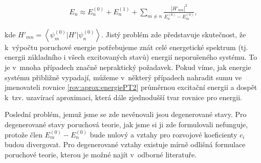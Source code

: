 \begin{eqnarray}
E_n\approx E_n^{(0)}+E_n^{(1)}+\sum_{m\neq n} \frac{\left | H'_{mn} \right |^2}{E_n^{(0)}-E_m^{(0)}},
\label{rov:aprox:energiePT2}
\end{eqnarray}

\noindent kde $H'_{mn}=\left < \psi_m^{(0)}|H'|\psi_n^{(0)}\right >$. Jistý problém zde představuje skutečnost, že k~výpočtu poruchové energie potřebujeme znát celé energetické spektrum (tj. energii základního i všech excitovaných stavů) energií neporušeného systému. To je v~mnoha případech značně nepraktický požadavek. Pokud víme, jak energie systému přibližně vypadají, můžeme v~některý případech nahradit sumu ve jmenovateli rovnice \ref{rov:aprox:energiePT2} průměrnou excitační energii a dospět k~tzv. uzavírací aproximaci, která dále zjednodušší tvar rovnice pro energii. 

Poslední problém, jemuž jsme se zde nevěnovali jsou degenerované stavy. Pro degenerované stavy poruchová teorie, jak jsme si ji zde formulovali nefunguje, protože člen $E_m^{(0)}-E_n^{(0)}$ bude nulový a vztahy pro rozvojové koeficienty $c_i$ budou divergovat. Pro degenerované vztahy existuje mírně odlišná formulace poruchové teorie, kterou je možné najít v~odborné literatuře. 






